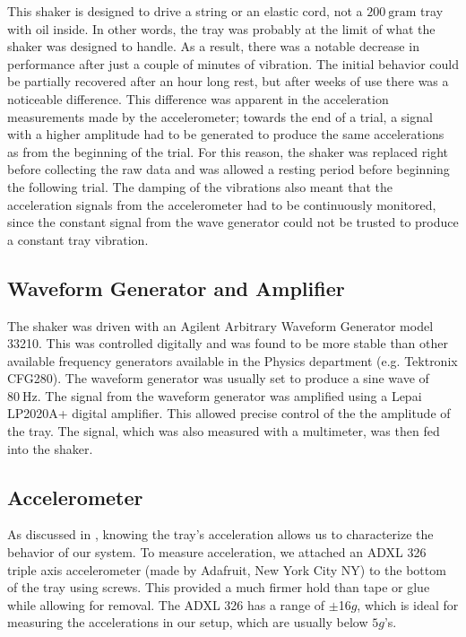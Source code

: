     This shaker is designed to drive a string or an elastic cord, not a $200~\mathrm{gram}$ tray with oil inside. In other words, the tray was probably at the limit of what the shaker was designed to handle. As a result, there was a notable decrease in performance after just a couple of minutes of vibration. The initial behavior could be partially recovered after an hour long rest, but after weeks of use there was a noticeable difference. This difference was apparent in the acceleration measurements made by the accelerometer; towards the end of a trial, a signal with a higher amplitude had to be generated to produce the same accelerations as from the beginning of the trial. For this reason, the shaker was replaced right before collecting the raw data and was allowed a resting period before beginning the following trial. The damping of the vibrations also meant that the acceleration signals from the accelerometer had to be continuously  monitored, since the constant signal from the wave generator could not be trusted to produce a constant tray vibration. 
    
\subsection{Waveform Generator and Amplifier}
    The shaker was driven with an Agilent Arbitrary Waveform Generator model 33210. This was controlled digitally and was found to be more stable than other available frequency generators available in the Physics department (e.g. Tektronix CFG280). The waveform generator was usually set to produce a sine wave of $80~\mathrm{Hz}$. The signal from the waveform generator was amplified using a Lepai LP2020A+ digital amplifier. This allowed precise control of the the amplitude of the tray. The signal, which was also measured with a multimeter, was then fed into the shaker.    
            
\subsection{Accelerometer}  
    As discussed in , knowing the tray's acceleration allows us to characterize the behavior of our system. To measure acceleration, we attached an ADXL 326 triple axis accelerometer (made by Adafruit, New York City NY) to the bottom of the tray using screws. This provided a much firmer hold than tape or glue while allowing for removal. The ADXL 326 has a range of $\pm$16$g$, which is ideal for measuring the accelerations in our setup, which are usually below $5g$'s. 
      

